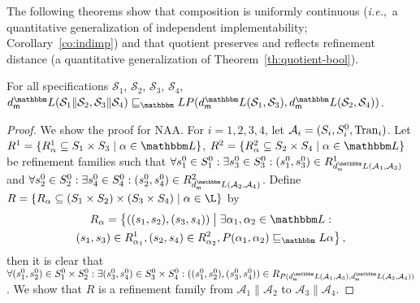 \documentclass[twocolumn]{svjour3-dummy}
\newcommand*\ie{\textit{i.e.},}
\newcommand*\NAA{NAA\xspace}
\newcommand*\cA{\mathcal A}
\newcommand*\Tran{\textup{\textrm{Tran}}}
\newcommand*\cS{\mathcal S}
\newcommand*\LL{\mathbbm L}
\begin{document}
The following theorems show that composition is uniformly continuous
(\ie~a quantitative generalization of independent implementability;
Corollary~\ref{co:indimp}) and that quotient preserves and reflects
refinement distance (a quantitative generalization of
Theorem~\ref{th:quotient-bool}).

\begin{theorem}\label{th:indimp-q}
  \quad For all specifications $\cS_1$, $\cS_2$, $\cS_3$, $\cS_4$, $\mdl(
  \cS_1\| \cS_2, \cS_3\| \cS_4)\sqsubseteq_\LL P( \mdl( \cS_1, \cS_3),
  \mdl( \cS_2, \cS_4))$.
\end{theorem}

\begin{proof}We show the proof for \NAA.  For $i= 1, 2, 3, 4$, let $\cA_i=( S_i,
  S_i^0, \Tran_i)$.  Let $R^1=\{ R^1_\alpha\subseteq S_1\times S_3\mid
  \alpha\in \LL\}$, $R^2=\{ R^2_\alpha\subseteq S_2\times S_4\mid
  \alpha\in \LL\}$ be refinement families such that $\forall s_1^0\in
  S_1^0: \exists s_3^0\in S_3^0:( s_1^0, s_3^0)\in R^1_{ \mdl( \cA_1,
    \cA_3)}$ and $\forall s_2^0\in S_2^0: \exists s_4^0\in S_4^0:(
  s_2^0, s_4^0)\in R^2_{ \mdl( \cA_2, \cA_4)}$.  Define $R=\{
  R_\alpha\subseteq( S_1\times S_2)\times( S_3\times S_4)\mid \alpha\in
  \L\}$ by
  \begin{multline*}
    R_\alpha= \big\{ ((s_1, s_2),( s_3, s_4))\bigmid \exists \alpha_1,
    \alpha_2\in \LL: \\
    ( s_1, s_3)\in R^1_{ \alpha_1},( s_2, s_4)\in R^2_{ \alpha_2}, P(
    \alpha_1, \alpha_2)\sqsubseteq_\LL \alpha\big\}\,,
  \end{multline*}
  then it is clear that $\forall( s_1^0, s_2^0)\in S_1^0\times S_2^0:
  \exists( s_3^0, s_4^0)\in S_3^0\times S_4^0:(( s_1^0, s_2^0),( s_3^0,
  s_4^0))\in R_{ P( \mdl( \cA_1, \cA_3), \mdl( \cA_2, \cA_4))}$.  We
  show that $R$ is a refinement family from $\cA_1\| \cA_2$ to $\cA_3\|
  \cA_4$.


\end{proof}
\end{document}
